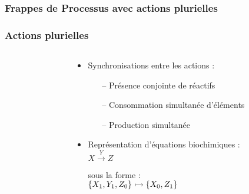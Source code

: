 
\begin{frame}[c]
  \frametitle{Frappes de Processus avec actions plurielles}


\end{frame}



\begin{frame}[c]
  \frametitle{Actions plurielles}

\begin{columns}
\begin{column}{.4\textwidth}


\end{column}
\begin{column}{.55\textwidth}
\begin{center}

\begin{itemize}
  \item Synchronisations entre les actions :
  \begin{itemize}
    \item[--] Présence conjointe de réactifs
    \item[--] Consommation simultanée d'éléments
    \item[--] Production simultanée
  \end{itemize}
  \item Représentation d'équations biochimiques :\\
    \centering $X \xrightarrow{Y} Z$\\
    \raggedright sous la forme :\\
    \centering $\mbox{$\{X_1, Y_1, Z_0\} \rightarrowtail \{X_0, Z_1\}$}$
\end{itemize}


\end{center}
\end{column}
\end{columns}
\end{frame}

